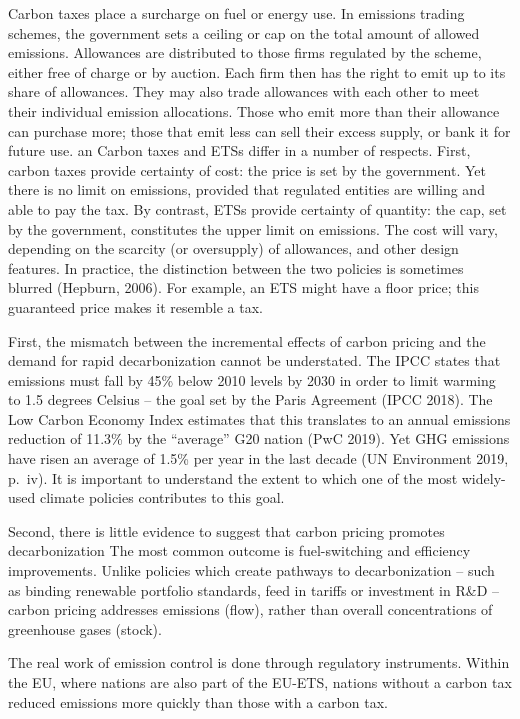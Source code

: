 \documentclass[
]{book}
\begin{document}
Carbon taxes place a surcharge on fuel or energy use. In emissions trading schemes, the
government sets a ceiling or cap on the total amount of allowed emissions. Allowances are
distributed to those firms regulated by the scheme, either free of charge or by auction. Each
firm then has the right to emit up to its share of allowances. They may also trade allowances
with each other to meet their individual emission allocations. Those who emit more than their
allowance can purchase more; those that emit less can sell their excess supply, or bank it for
future use.
an
Carbon taxes and ETSs differ in a number of respects. First, carbon taxes provide certainty of
cost: the price is set by the government. Yet there is no limit on emissions, provided that
regulated entities are willing and able to pay the tax. By contrast, ETSs provide certainty of
quantity: the cap, set by the government, constitutes the upper limit on emissions. The cost
will vary, depending on the scarcity (or oversupply) of allowances, and other design features. In
practice, the distinction between the two policies is sometimes blurred (Hepburn, 2006). For
example, an ETS might have a floor price; this guaranteed price makes it resemble a tax.

First, the mismatch between the incremental effects of
carbon pricing and the demand for rapid decarbonization cannot be understated. The IPCC
states that emissions must fall by 45\% below 2010 levels by 2030 in order to limit warming to
1.5 degrees Celsius -- the goal set by the Paris Agreement (IPCC 2018). The Low Carbon
Economy Index estimates that this translates to an annual emissions reduction of 11.3\% by the
``average'' G20 nation (PwC 2019). Yet GHG emissions have risen an average of 1.5\% per year in
the last decade (UN Environment 2019, p.~iv). It is important to understand the extent to which
one of the most widely-used climate policies contributes to this goal.

Second, there is little evidence to suggest that carbon pricing promotes decarbonization
The most common outcome is fuel-switching and efficiency improvements.
Unlike policies which create pathways to decarbonization -- such as binding renewable
portfolio standards, feed in tariffs or investment in R\&D --
carbon pricing addresses emissions (flow), rather than overall concentrations of
greenhouse gases (stock).

The real work of emission control is done through regulatory instruments.
Within the EU, where nations are also part of the EU-ETS, nations without a carbon
tax reduced emissions more quickly than those with a carbon tax.
\end{document}
